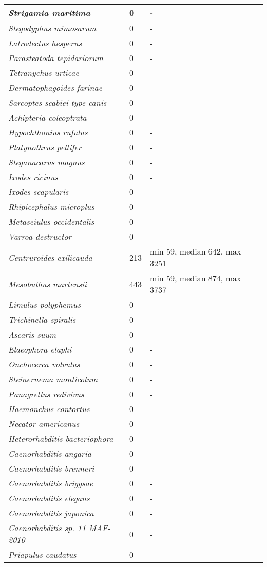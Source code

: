 {\begin{longtable}{| L{4cm} | L{2cm}  | L{5cm} | L{4cm} |}
\textit{Strigamia maritima} & 0 & - & \\ \hline
\textit{Stegodyphus mimosarum} & 0 & - & \\ \hline
\textit{Latrodectus hesperus} & 0 & - & \\ \hline
\textit{Parasteatoda tepidariorum} & 0 & - & \\ \hline
\textit{Tetranychus urticae} & 0 & - & \\ \hline
\textit{Dermatophagoides farinae} & 0 & - & \\ \hline
\textit{Sarcoptes scabiei type canis} & 0 & - & \\ \hline
\textit{Achipteria coleoptrata} & 0 & - & \\ \hline
\textit{Hypochthonius rufulus} & 0 & - & \\ \hline
\textit{Platynothrus peltifer} & 0 & - & \\ \hline
\textit{Steganacarus magnus} & 0 & - & \\ \hline
\textit{Ixodes ricinus} & 0 & - & \\ \hline
\textit{Ixodes scapularis} & 0 & - & \\ \hline
\textit{Rhipicephalus microplus} & 0 & - & \\ \hline
\textit{Metaseiulus occidentalis} & 0 & - & \\ \hline
\textit{Varroa destructor} & 0 & - & \\ \hline
\textit{Centruroides exilicauda} & 213 & min 59, median 642, max 3251 & \\ \hline
\textit{Mesobuthus martensii} & 443 & min 59, median 874, max 3737 & \\ \hline
\textit{Limulus polyphemus} & 0 & - & \\ \hline
\textit{Trichinella spiralis} & 0 & - & \\ \hline
\textit{Ascaris suum} & 0 & - & \\ \hline
\textit{Elaeophora elaphi} & 0 & - & \\ \hline
\textit{Onchocerca volvulus} & 0 & - & \\ \hline
\textit{Steinernema monticolum} & 0 & - & \\ \hline
\textit{Panagrellus redivivus} & 0 & - & \\ \hline
\textit{Haemonchus contortus} & 0 & - & \\ \hline
\textit{Necator americanus} & 0 & - & \\ \hline
\textit{Heterorhabditis bacteriophora} & 0 & - & \\ \hline
\textit{Caenorhabditis angaria} & 0 & - & \\ \hline
\textit{Caenorhabditis brenneri} & 0 & - & \\ \hline
\textit{Caenorhabditis briggsae} & 0 & - & \\ \hline
\textit{Caenorhabditis elegans} & 0 & - & \\ \hline
\textit{Caenorhabditis japonica} & 0 & - & \\ \hline
\textit{Caenorhabditis sp. 11 MAF-2010} & 0 & - & \\ \hline
\textit{Priapulus caudatus} & 0 & - & \\ \hline


\end{longtable}}
